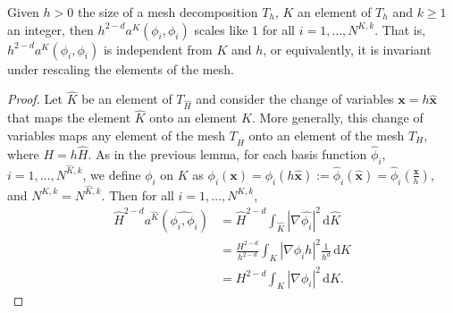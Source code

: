 \begin{lemma} \label{lemma2}
Given $h>0$ the size of a mesh decomposition $T_h$, $K$ an element of $T_h$ and $k\geq 1$ an integer, then $h^{2-d}a^K(\phi_i,\phi_i)$ scales like $1$ for all $i=1,\ldots,N^{K,k}$. That is, $h^{2-d}a^K(\phi_i,\phi_i)$ is independent from $K$ and $h$, or equivalently, it is invariant under rescaling the elements of the mesh. 
\end{lemma}
\begin{proof}
Let $\hat{K}$ be an element of $T_{\hat{H}}$ and consider the change of variables $\mathbf{x}=h\hat{\mathbf{x}}$ that maps the element $\hat{K}$ onto an element $K$. More generally, this change of variables maps any element of the mesh $T_{\hat{H}}$ onto an element of the mesh $T_H$, where $H=h\hat{H}$. As in the previous lemma, for each basis function $\hat{\phi}_i$, $i=1,\ldots,N^{\hat{K},k}$, we define $\phi_i$ on $K$ as $\phi_i(\mathbf{x}) = \phi_i(h\mathbf{\hat{x}}) := \hat{\phi}_i(\hat{\mathbf{x}}) = \hat{\phi}_i\left(\frac{\mathbf{x}}{h}\right)$, and $N^{K,k}=N^{\hat{K},k}$. Then for all $i=1,\ldots,N^{K,k}$, 
\begin{align*}
\hat{H}^{2-d}a^{\hat{K}}(\hat{\phi_i,\phi_i}) &= \hat{H}^{2-d}\int_{\hat{K}} |\nabla \hat{\phi_i}|^2 \, \mathrm{d}\hat{K} \\
&= \frac{H^{2-d}}{h^{2-d}} \int_K |\nabla \phi_i h|^2 \frac{1}{h^d} \, \mathrm{d}K\\
&= H^{2-d} \int_K |\nabla \phi_i|^2 \, \mathrm{d}K.
\end{align*}
\end{proof}


